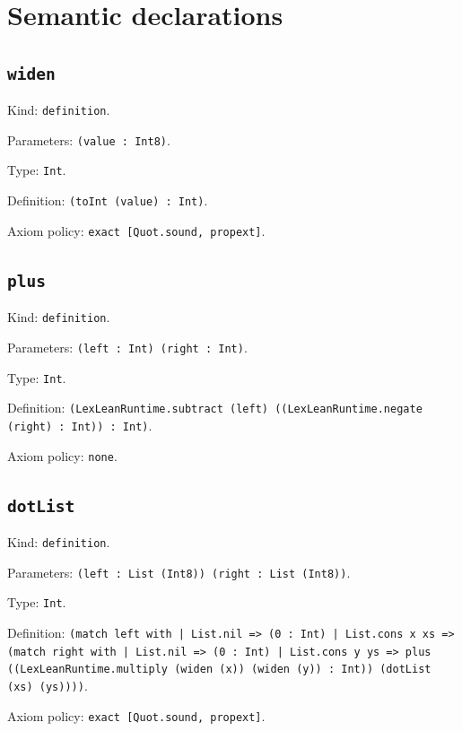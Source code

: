 \documentclass[11pt]{article}
\begin{document}
\section*{Semantic declarations}
\subsection*{\texttt{widen}}
\noindent Kind: \texttt{definition}.\par
\noindent Parameters: \texttt{(value : Int8)}.\par
\noindent Type: \texttt{Int}.\par
\noindent Definition: \texttt{(toInt (value) : Int)}.\par
\noindent Axiom policy: \texttt{exact [Quot.sound, propext]}.\par
\subsection*{\texttt{plus}}
\noindent Kind: \texttt{definition}.\par
\noindent Parameters: \texttt{(left : Int) (right : Int)}.\par
\noindent Type: \texttt{Int}.\par
\noindent Definition: \texttt{(LexLeanRuntime.subtract (left) ((LexLeanRuntime.negate (right) : Int)) : Int)}.\par
\noindent Axiom policy: \texttt{none}.\par
\subsection*{\texttt{dotList}}
\noindent Kind: \texttt{definition}.\par
\noindent Parameters: \texttt{(left : List (Int8)) (right : List (Int8))}.\par
\noindent Type: \texttt{Int}.\par
\noindent Definition: \texttt{(match left with | List.nil => (0 : Int) | List.cons x xs => (match right with | List.nil => (0 : Int) | List.cons y ys => plus ((LexLeanRuntime.multiply (widen (x)) (widen (y)) : Int)) (dotList (xs) (ys))))}.\par
\noindent Axiom policy: \texttt{exact [Quot.sound, propext]}.\par
\end{document}

